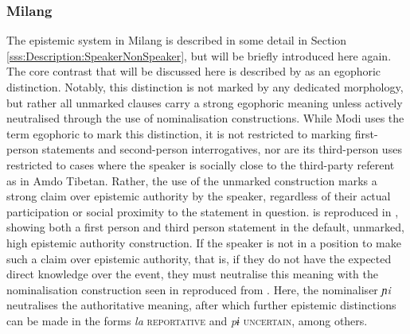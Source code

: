 \subsubsection{Milang}\label{sss:Discussion:MilangCase}
The epistemic system in Milang is described in some detail in Section \ref{sss:Description:SpeakerNonSpeaker}, but will be briefly introduced here again. The core contrast that will be discussed here is described by  as an egophoric distinction. Notably, this distinction is not marked by any dedicated morphology, but rather all unmarked clauses carry a strong egophoric meaning unless actively neutralised through the use of nominalisation constructions.  While Modi uses the term egophoric to mark this distinction, it is not restricted to marking first-person statements and second-person interrogatives, nor are its third-person uses restricted to cases where the speaker is socially close to the third-party referent as in Amdo Tibetan. Rather, the use of the unmarked construction marks a strong claim over epistemic authority by the speaker, regardless of their actual participation or social proximity to the statement in question.  is reproduced in , showing both a first person and third person statement in the default, unmarked, high epistemic authority construction. If the speaker is not in a position to make such a claim over epistemic authority, that is, if they do not have the expected direct knowledge over the event, they must neutralise this meaning with the nominalisation construction seen in  reproduced from . Here, the nominaliser \textit{ɲi} neutralises the authoritative meaning, after which further epistemic distinctions can be made in the forms \textit{la} \textsc{reportative} and \textit{pɨ} \textsc{uncertain}, among others.

